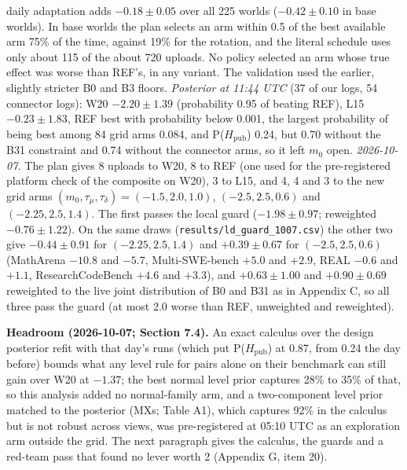 \documentclass[
]{article}
\begin{document}
daily adaptation adds \(-0.18 \pm 0.05\) over all 225 worlds
(\(-0.42 \pm 0.10\) in base worlds). In base worlds the plan selects an
arm within 0.5 of the best available arm 75\% of the time, against 19\%
for the rotation, and the literal schedule uses only about 115 of the
about 720 uploads. No policy selected an arm whose true effect was worse
than REF's, in any variant. The validation used the earlier, slightly
stricter B0 and B3 floors. \emph{Posterior at 11:44 UTC} (37 of our
logs, 54 connector logs): W20 \(-2.20 \pm 1.39\) (probability 0.95 of
beating REF), L15 \(-0.23 \pm 1.83\), REF best with probability below
0.001, the largest probability of being best among 84 grid arms 0.084,
and P(\(H_{\mathrm{pub}}\)) 0.24, but 0.70 without the B31 constraint
and 0.74 without the connector arms, so it left \(m_0\) open.
\emph{2026-10-07.} The plan gives 8 uploads to W20, 8 to REF (one used
for the pre-registered platform check of the composite on W20), 3 to
L15, and 4, 4 and 3 to the new grid arms
\((m_0, \tau_\mu, \tau_\delta) = (-1.5, 2.0, 1.0)\),
\((-2.5, 2.5, 0.6)\) and \((-2.25, 2.5, 1.4)\). The first passes the
local guard (\(-1.98 \pm 0.97\); reweighted \(-0.76 \pm 1.22\)). On the
same draws (\texttt{results/ld\_guard\_1007.csv}) the other two give
\(-0.44 \pm 0.91\) for \((-2.25, 2.5, 1.4)\) and \(+0.39 \pm 0.67\) for
\((-2.5, 2.5, 0.6)\) (MathArena \(-10.8\) and \(-5.7\), Multi-SWE-bench
\(+5.0\) and \(+2.9\), REAL \(-0.6\) and \(+1.1\), ResearchCodeBench
\(+4.6\) and \(+3.3\)), and \(+0.63 \pm 1.00\) and \(+0.90 \pm 0.69\)
reweighted to the live joint distribution of B0 and B31 as in Appendix
C, so all three pass the guard (at most 2.0 worse than REF, unweighted
and reweighted).

\textbf{Headroom (2026-10-07; Section 7.4).} An exact calculus over the
design posterior refit with that day's runs (which put
P(\(H_{\mathrm{pub}}\)) at 0.87, from 0.24 the day before) bounds what
any level rule for pairs alone on their benchmark can still gain over
W20 at \(-1.37\); the best normal level prior captures 28\% to 35\% of
that, so this analysis added no normal-family arm, and a two-component
level prior matched to the posterior (MXs; Table A1), which captures
92\% in the calculus but is not robust across views, was pre-registered
at 05:10 UTC as an exploration arm outside the grid. The next paragraph
gives the calculus, the guards and a red-team pass that found no lever
worth 2 (Appendix G, item 20).
\end{document}
